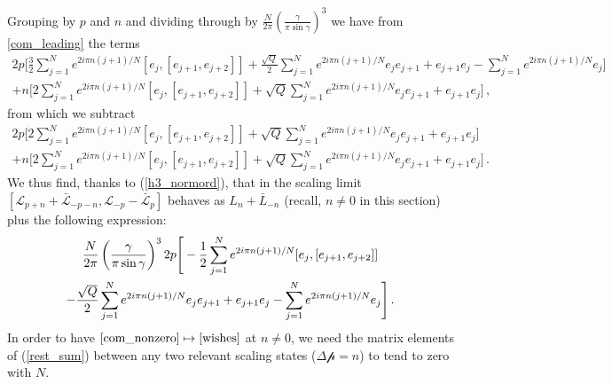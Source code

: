 \documentclass[a4paper,10pt]{article}
\newcommand{\linnea}[1]{$\framebox{\tiny L}$\ \textbf{\texttt{{\color{red}\footnotesize#1}}}}
\newcommand{\Pscaled}{{\mathcal p}}
\newcommand{\KSgen}{\mathcal{L}}
\begin{document}
Grouping by $p$ and $n$ and dividing   through by $\frac{N}{2\pi}\left( \frac{\gamma}{\pi \sin \gamma} \right)^3$ we have from \eqref{com_leading} the terms
\begin{multline}
2p \Bigg[  \frac{3}{2}\sum_{j=1}^{N}  e^{2i\pi n (j+1) /N}
{ [e_j,[e_{j+1},e_{j+2}]] } 
  + \frac{\sqrt{Q}}{2}  \sum_{j=1}^{N} e^{2i\pi n (j+1) /N}
{e_je_{j+1} + e_{j+1}e_j } 
 - \sum_{j=1}^{N} e^{2i\pi n (j+1)/N} {e_{j}   } 
   \Bigg]\\
  + n \Bigg[
   2 \sum_{j=1}^{N}  e^{2i\pi n (j+1) /N}
{ [e_j,[e_{j+1},e_{j+2}]]} + \sqrt{Q} \sum_{j=1}^{N} e^{2i\pi n (j+1) /N}
{e_je_{j+1} + e_{j+1}e_j} 
  \Bigg] \,, \label{bigeq1}
%
\end{multline}
from which we subtract %
\begin{multline}
2p \Bigg[ 2\sum_{j=1}^{N}  e^{2i\pi n (j+1) /N}
{ [e_j,[e_{j+1},e_{j+2}]] } 
  +  \sqrt{Q}\sum_{j=1}^{N} e^{2i\pi n (j+1) /N}
{e_je_{j+1} + e_{j+1}e_j} 
   \Bigg]\\
  + n \Bigg[
   2 \sum_{j=1}^{N}  e^{2i\pi n (j+1) /N}
{ [e_j,[e_{j+1},e_{j+2}]] }+ \sqrt{Q}\sum_{j=1}^{N} e^{2i\pi n (j+1) /N}
{e_je_{j+1} + e_{j+1}e_j } \label{bigeq2}
  \Bigg] \,.
%
\end{multline}
We thus find, thanks to  (\ref{h3_normord}),  that in the scaling limit $
[\KSgen_{p+n}+\bar{\KSgen}_{-p-n},\KSgen_{-p}-\bar{\KSgen}_{p}]$  behaves as $L_n+\bar{L}_{-n}$ (recall, $n\neq 0$ in this section) plus the following expression: %
%
\begin{multline}\label{rest_sum}
\frac{N}{2\pi}\left({\gamma\over\pi\sin\gamma}\right)^32p\Bigg[ -\frac{1}{2} \sum_{j=1}^{N} e^{2i\pi n (j+1) /N}
 {[e_j,[e_{j+1},e_{j+2}]]} \\
 - \frac{ \sqrt{Q}}{2}  \sum_{j=1}^{N} e^{2i\pi n (j+1) /N}
 { e_je_{j+1} + e_{j+1}e_j}  - \sum_{j=1}^{N} e^{2i\pi n (j+1)/N} {e_{j}} \Bigg] \,.
\end{multline}
%
In order to have $\eqref{com_nonzero} \mapsto \eqref{wishes}$ at $n\neq 0$, we need  the matrix elements of (\ref{rest_sum}) between any two relevant scaling states ($\Delta \Pscaled = n$) to tend to zero with $N$. %
\end{document}
